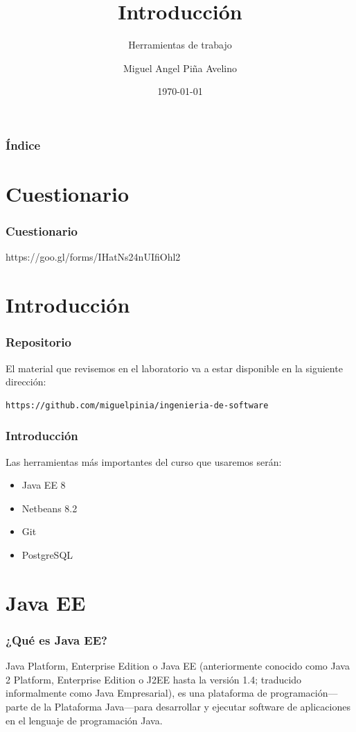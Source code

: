 \documentclass{beamer}
\title[Laboratorio]{Introducción}
\subtitle{Herramientas de trabajo}
\author[Miguel]{Miguel Angel Piña Avelino}
\institute[UNAM]{
  Facultad de Ciencias, UNAM
}
\date{\today}
\begin{document}
\frame{\titlepage}

\begin{frame}
  \frametitle{Índice}
  \tableofcontents
\end{frame}

\section{Cuestionario}

\begin{frame}
  \frametitle{Cuestionario}
  https://goo.gl/forms/IHatNs24nUIfiOhl2
\end{frame}

\section{Introducción}

\begin{frame}[fragile]
  \frametitle{Repositorio}
  El material que revisemos en el laboratorio va a estar disponible en
  la siguiente dirección:
\begin{verbatim}
https://github.com/miguelpinia/ingenieria-de-software
\end{verbatim}
\end{frame}

\begin{frame}
  \frametitle{Introducción}
  Las herramientas más importantes del curso que usaremos serán:
  \begin{itemize}
    \item Java EE 8
    \item Netbeans 8.2
    \item Git
    \item PostgreSQL
  \end{itemize}
\end{frame}

\section{Java EE}

\begin{frame}
  \frametitle{¿Qué es Java EE?}
  Java Platform, Enterprise Edition o Java EE (anteriormente conocido
  como Java 2 Platform, Enterprise Edition o J2EE hasta la versión
  1.4; traducido informalmente como Java Empresarial), es una
  plataforma de programación—parte de la Plataforma Java—para
  desarrollar y ejecutar software de aplicaciones en el lenguaje de
  programación Java.
\end{frame}
\end{document}
